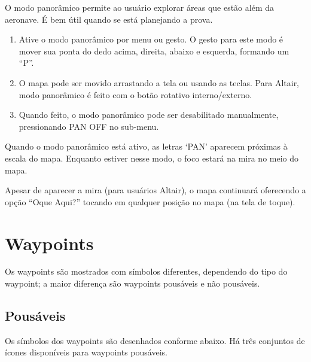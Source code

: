 O modo panorâmico permite ao usuário explorar áreas que estão além da aeronave.  É bem útil quando se está planejando a prova.
\begin{enumerate}
\item Ative o modo panorâmico por menu ou gesto.  O gesto para este modo é mover sua ponta do dedo acima, direita, abaixo e esquerda, formando um “P”. 
\item O mapa pode ser movido arrastando a tela ou usando as teclas.  Para Altair, modo panorâmico é feito com o botão rotativo interno/externo.  
\item Quando feito, o modo panorâmico pode ser desabilitado manualmente, pressionando PAN OFF no sub-menu.
\end{enumerate} 

Quando o modo panorâmico está ativo, as letras ‘PAN’ aparecem próximas à escala do mapa.  Enquanto estiver nesse modo, o foco estará na mira no meio do mapa.

Apesar de aparecer a mira (para usuários Altair), o mapa continuará oferecendo a opção “Oque Aqui?” tocando em qualquer posição no mapa (na tela de toque). 


\section{Waypoints} \label{sec:waypoint-schemes}
Os waypoints são mostrados com símbolos diferentes, dependendo do tipo do waypoint; a maior diferença são waypoints pousáveis e não pousáveis.

\subsection*{Pousáveis}
Os símbolos dos waypoints são desenhados conforme abaixo.  Há três conjuntos de ícones disponíveis para waypoints pousáveis. 


